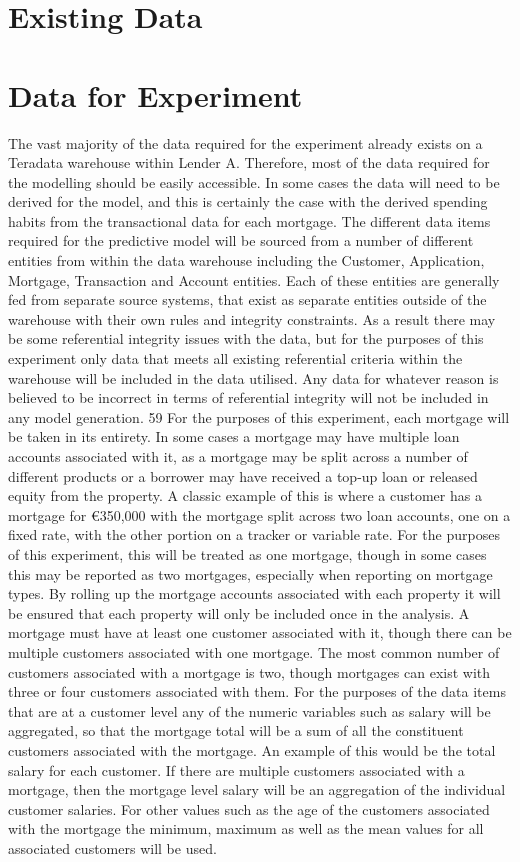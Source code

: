 \section{Existing Data}


\section{Data for Experiment}


The vast majority of the data required for the experiment already exists on a Teradata warehouse within Lender A. Therefore, most of the data required for the modelling should be easily accessible. In some cases the data will need to be derived for the model, and this is certainly the case with the derived spending habits from the transactional data for each mortgage.
The different data items required for the predictive model will be sourced from a number of different entities from within the data warehouse including the Customer, Application, Mortgage, Transaction and Account entities. Each of these entities are generally fed from separate source systems, that exist as separate entities outside of the warehouse with their own rules and integrity constraints. As a result there may be some referential integrity issues with the data, but for the purposes of this experiment only data that meets all existing referential criteria within the warehouse will be included in the data utilised. Any data for whatever reason is believed to be incorrect in terms of referential integrity will not be included in any model generation.
59
For the purposes of this experiment, each mortgage will be taken in its entirety. In some cases a mortgage may have multiple loan accounts associated with it, as a mortgage may be split across a number of different products or a borrower may have received a top-up loan or released equity from the property. A classic example of this is where a customer has a mortgage for \euro 350,000 with the mortgage split across two loan accounts, one on a fixed rate, with the other portion on a tracker or variable rate. For the purposes of this experiment, this will be treated as one mortgage, though in some cases this may be reported as two mortgages, especially when reporting on mortgage types. By rolling up the mortgage accounts associated with each property it will be ensured that each property will only be included once in the analysis.
A mortgage must have at least one customer associated with it, though there can be multiple customers associated with one mortgage. The most common number of customers associated with a mortgage is two, though mortgages can exist with three or four customers associated with them. For the purposes of the data items that are at a customer level any of the numeric variables such as salary will be aggregated, so that the mortgage total will be a sum of all the constituent customers associated with the mortgage. An example of this would be the total salary for each customer. If there are multiple customers associated with a mortgage, then the mortgage level salary will be an aggregation of the individual customer salaries. For other values such as the age of the customers associated with the mortgage the minimum, maximum as well as the mean values for all associated customers will be used.
